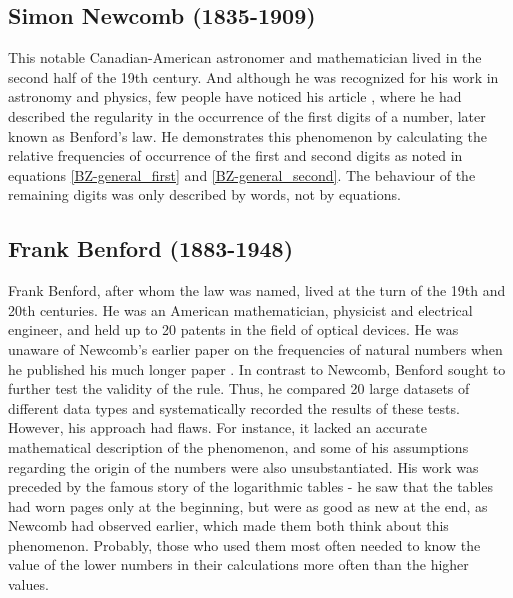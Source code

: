 
\subsection{Simon Newcomb (1835-1909)}

This notable Canadian-American astronomer and mathematician lived in the second half of the 19th century. And although he was recognized for his work in astronomy and physics, few people have noticed his article \textit{}, where he had described the regularity in the occurrence of the first digits of a number, later known as Benford's law. He demonstrates this phenomenon by calculating the relative frequencies of occurrence of the first and second digits as noted in equations \ref{BZ-general_first} and \ref{BZ-general_second}. The behaviour of the remaining digits was only described by words, not by equations. \cite{kossovsky2014benford, Newcomb1881, Hronova2023, SimonNewcomb}  

\subsection{Frank Benford (1883-1948)}

Frank Benford, after whom the law was named, lived at the turn of the 19th and 20th centuries. He was an American mathematician, physicist and electrical engineer, and held up to 20 patents in the field of optical devices. He was unaware of Newcomb's earlier paper on the frequencies of natural numbers when he published his much longer paper \textit{}. In contrast to Newcomb, Benford sought to further test the validity of the rule. Thus, he compared 20 large datasets of different data types and systematically recorded the results of these tests. However, his approach had flaws. For instance, it lacked an accurate mathematical description of the phenomenon, and some of his assumptions regarding the origin of the numbers were also unsubstantiated. His work was preceded by the famous story of the logarithmic tables - he saw that the tables had worn pages only at the beginning, but were as good as new at the end, as Newcomb had observed earlier, which made them both think about this phenomenon. Probably, those who used them most often needed to know the value of the lower numbers in their calculations more often than the higher values.  \cite{Benford1938, kossovsky2014benford, Hronova2023}

